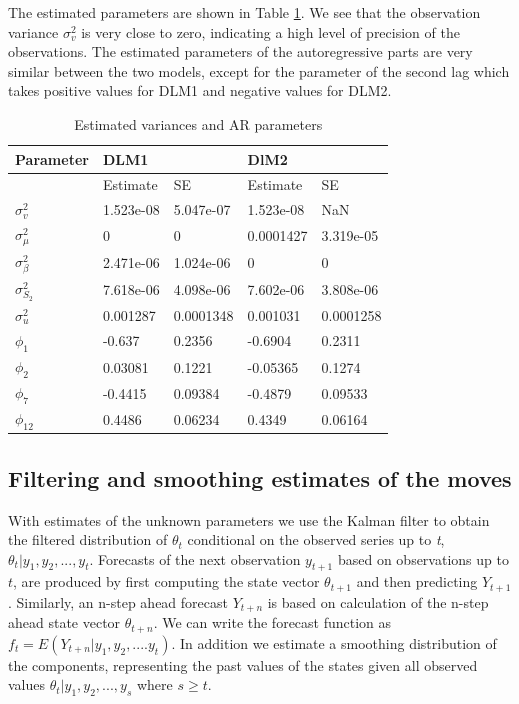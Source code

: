 \documentclass[]{article}
\begin{document}
The estimated parameters are shown in Table
\ref{tab:estimated-parameters}. We see that the observation variance
\(\sigma_{v}^{2}\) is very close to zero, indicating a high level of
precision of the observations. The estimated parameters of the
autoregressive parts are very similar between the two models, except for
the parameter of the second lag which takes positive values for DLM1 and
negative values for DLM2.

\begin{table}[t]

\caption{\label{tab:estimated-parameters}Estimated variances and AR parameters}
\centering
\begin{tabular}{lllll}
\toprule
Parameter & DLM1 &   & DlM2 &  \\
\midrule
 & Estimate & SE & Estimate & SE\\
$\sigma_{v}^{2}$ & 1.523e-08 & 5.047e-07 & 1.523e-08 & NaN\\
$\sigma_{\mu}^{2}$ & 0 & 0 & 0.0001427 & 3.319e-05\\
$\sigma_{\beta}^{2}$ & 2.471e-06 & 1.024e-06 & 0 & 0\\
$\sigma_{S_{2}}^{2}$ & 7.618e-06 & 4.098e-06 & 7.602e-06 & 3.808e-06\\
\addlinespace
$\sigma^{2}_{u}$ & 0.001287 & 0.0001348 & 0.001031 & 0.0001258\\
$\phi_{1}$ & -0.637 & 0.2356 & -0.6904 & 0.2311\\
$\phi_{2}$ & 0.03081 & 0.1221 & -0.05365 & 0.1274\\
$\phi_{7}$ & -0.4415 & 0.09384 & -0.4879 & 0.09533\\
$\phi_{12}$ & 0.4486 & 0.06234 & 0.4349 & 0.06164\\
\bottomrule
\end{tabular}
\end{table}

\subsection{Filtering and smoothing estimates of the
moves}\label{filtering-and-smoothing-estimates-of-the-moves}

With estimates of the unknown parameters we use the Kalman filter to
obtain the filtered distribution of \(\theta_{t}\) conditional on the
observed series up to \emph{t}, \(\theta_{t} | y_{1}, y_{2},...,y_{t}\).
Forecasts of the next observation \(y_{t+1}\) based on observations up
to \(t\), are produced by first computing the state vector
\(\theta_{t+1}\) and then predicting \(Y_{t+1}\). Similarly, an n-step
ahead forecast \(Y_{t+n}\) is based on calculation of the n-step ahead
state vector \(\theta_{t+n}\). We can write the forecast function as
\(f_{t} = E(Y_{t+n} | y_{1}, y_{2}, ....y_{t})\). In addition we
estimate a smoothing distribution of the components, representing the
past values of the states given all observed values
\(\theta_{t} | y_{1}, y_{2},...,y_{s}\) where \(s \ge t\).
\end{document}
